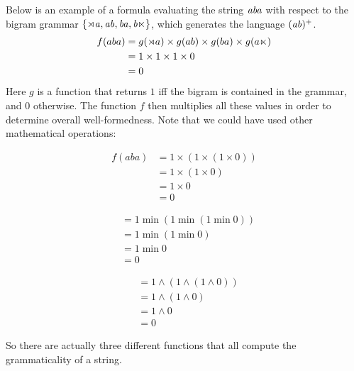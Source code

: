 Below is an example of a formula evaluating the string $\mathit{aba}$ with respect to the bigram grammar $\left \{ \mathit{\rtimes a}, \mathit{ab}, \mathit{ba}, \mathit{b\ltimes} \right \}$, which generates the language $(\mathit{ab})^+$.
%
\begin{align*}
    f(aba) & =
            g(\rtimes a)
            \times
            g(ab)
            \times
            g(ba)
            \times
            g(a\ltimes)
            \\
            & =
            1
            \times
            1
            \times
            1
            \times
            0
            \\
            & =
            0
\end{align*}
%
Here $g$ is a function that returns $1$ iff the bigram is contained in the grammar, and $0$ otherwise.
The function $f$ then multiplies all these values in order to determine overall well-formedness.
Note that we could have used other mathematical operations:
%
\begin{center}
    \begin{minipage}{.35\linewidth}
        \begin{align*}
            f(aba)
            &= 1 \times (1 \times (1 \times 0)) \\
            &= 1 \times (1 \times 0) \\
            &= 1 \times 0\\
            &= 0
        \end{align*}
    \end{minipage}
    \begin{minipage}{.2\linewidth}
        \begin{align*}
            &= 1 \mathrel{\text{min}} (1 \mathrel{\text{min}} (1 \mathrel{\text{min}} 0)) \\
            &= 1 \mathrel{\text{min}} (1 \mathrel{\text{min}} 0) \\
            &= 1 \mathrel{\text{min}} 0\\
            &= 0
        \end{align*}
    \end{minipage}
    \begin{minipage}{.25\linewidth}
        \begin{align*}
            &= 1 \wedge (1 \wedge (1 \wedge 0)) \\
            &= 1 \wedge (1 \wedge 0) \\
            &= 1 \wedge 0\\
            &= 0
        \end{align*}
    \end{minipage}
\end{center}
%
So there are actually three different functions that all compute the grammaticality of a string.

